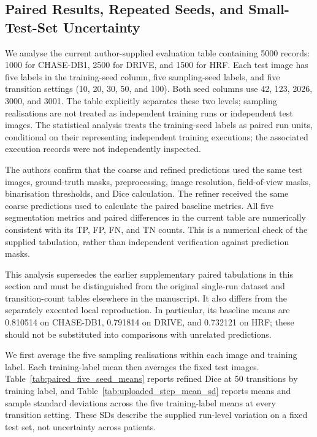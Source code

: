 \documentclass[jimaging,article,submit,pdftex,moreauthors]
  {Definitions/mdpi}
\begin{document}
\subsection{Paired Results, Repeated Seeds, and Small-Test-Set Uncertainty}
\label{sec:per_image_uncertainty}

We analyse the current author-supplied evaluation table containing 5000 records: 1000 for CHASE-DB1, 2500 for DRIVE, and 1500 for HRF. Each test image has five labels in the training-seed column, five sampling-seed labels, and five transition settings (10, 20, 30, 50, and 100). Both seed columns use 42, 123, 2026, 3000, and 3001. The table explicitly separates these two levels; sampling realisations are not treated as independent training runs or independent test images. The statistical analysis treats the training-seed labels as paired run units, conditional on their representing independent training executions; the associated execution records were not independently inspected.

The authors confirm that the coarse and refined predictions used the same test images, ground-truth masks, preprocessing, image resolution, field-of-view masks, binarisation thresholds, and Dice calculation. The refiner received the same coarse predictions used to calculate the paired baseline metrics. All five segmentation metrics and paired differences in the current table are numerically consistent with its TP, FP, FN, and TN counts. This is a numerical check of the supplied tabulation, rather than independent verification against prediction masks.

This analysis supersedes the earlier supplementary paired tabulations in this section and must be distinguished from the original single-run dataset and transition-count tables elsewhere in the manuscript. It also differs from the separately executed local reproduction. In particular, its baseline means are 0.810514 on CHASE-DB1, 0.791814 on DRIVE, and 0.732121 on HRF; these should not be substituted into comparisons with unrelated predictions.

We first average the five sampling realisations within each image and training label. Each training-label mean then averages the fixed test images. Table~\ref{tab:paired_five_seed_means} reports refined Dice at 50 transitions by training label, and Table~\ref{tab:uploaded_step_mean_sd} reports means and sample standard deviations across the five training-label means at every transition setting. These SDs describe the supplied run-level variation on a fixed test set, not uncertainty across patients.
\end{document}
